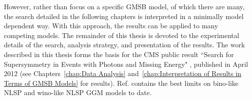 \documentclass[dissertation.tex]{subfiles}
\begin{document}
However, rather than focus on a specific GMSB model, of which there are many, the search detailed in the following chapters is interpreted in a minimally model dependent way.  With this approach, the results can be applied to many competing models.  The remainder of this thesis is devoted to the experimental details of the search, analysis strategy, and presentation of the results.  The work described in this thesis forms the basis for the CMS public result ``Search for Supersymmetry in Events with Photons and Missing Energy" \cite{CMS_GMSB_5fb-1}, published in April 2012 (see Chapters~\ref{chap:Data Analysis} and~\ref{chap:Interpretation of Results in Terms of GMSB Models} for results).  Ref. \cite{CMS_GMSB_5fb-1} contains the best limits on bino-like NLSP and wino-like NLSP GGM models to date.
\end{document}
